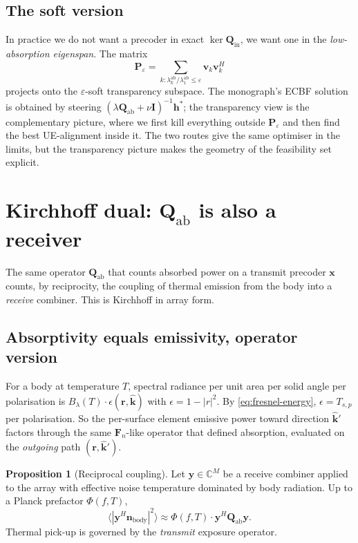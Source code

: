\documentclass[11pt,a4paper]{article}
\theoremstyle{definition}
\newtheorem{proposition}[proposition]{Proposition}
\newcommand{\khat}{\hat{\bm{k}}}
\newcommand{\rr}{\mathbf{r}}
\newcommand{\Complex}{\mathbb{C}}
\newcommand{\Fn}{\mathbf{F}_{\!n}}
\newcommand{\Qabs}{\mathbf{Q}_{\mathrm{ab}}}
\newcommand{\Qinn}{\mathbf{Q}_{\mathrm{in}}}
\begin{document}
\subsection{The soft version}

In practice we do not want a precoder in exact $\ker\Qinn$, we want
one in the \emph{low-absorption eigenspan}.  The matrix
\begin{equation}
  \mathbf{P}_\varepsilon =
  \sum_{k:\lambda_k^{\mathrm{ab}}/\lambda_1^{\mathrm{ab}}\le\varepsilon}
        \mathbf{v}_k\mathbf{v}_k^{\!H}
\end{equation}
projects onto the $\varepsilon$-soft transparency subspace.  The
monograph's ECBF solution is obtained by steering
$(\lambda\Qabs+\nu\mathbf{I})^{-1}\mathbf{h}^*$; the transparency
view is the complementary picture, where we first kill everything
outside $\mathbf{P}_\varepsilon$ and then find the best
UE-alignment inside it.  The two routes give the same optimiser in
the limits, but the transparency picture makes the geometry of the
feasibility set explicit.

\section{Kirchhoff dual: $\Qabs$ is also a receiver}

The same operator $\Qabs$ that counts absorbed power on a transmit
precoder $\mathbf{x}$ counts, by reciprocity, the coupling of
thermal emission from the body into a \emph{receive} combiner.
This is Kirchhoff in array form.

\subsection{Absorptivity equals emissivity, operator version}

For a body at temperature $T$, spectral radiance per unit area per
solid angle per polarisation is $B_\lambda(T)\cdot\epsilon(\rr,\khat)$
with $\epsilon=1-|r|^2$.  By \cref{eq:fresnel-energy},
$\epsilon=T_{s,p}$ per polarisation.  So the per-surface element
emissive power toward direction $\khat'$ factors through the same
$\Fn$-like operator that defined absorption, evaluated on the
\emph{outgoing} path $(\rr,\khat')$.

\begin{proposition}[Reciprocal coupling]\label{prop:kirch}
Let $\mathbf{y}\in\Complex^M$ be a receive combiner applied to the
array with effective noise temperature dominated by body radiation.
Up to a Planck prefactor $\Phi(f,T)$,
\begin{equation}\label{eq:kirch}
  \langle|\mathbf{y}^H\mathbf{n}_{\mathrm{body}}|^2\rangle
  \approx \Phi(f,T)\cdot \mathbf{y}^H\Qabs\mathbf{y}.
\end{equation}
Thermal pick-up is governed by the \emph{transmit} exposure operator.
\end{proposition}
\end{document}
